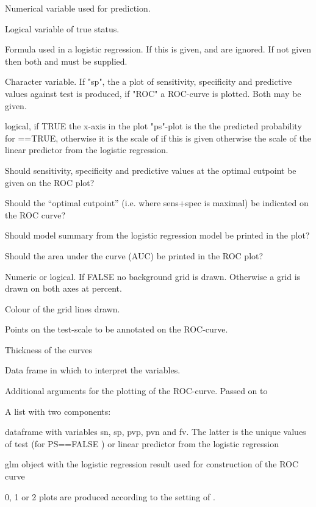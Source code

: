 \begin{Arguments}
\begin{ldescription}
\item[\code{test}] Numerical variable used for prediction. 
\item[\code{stat}] Logical variable of true status. 
\item[\code{form}] Formula used in a logistic regression. If this is given,
 and  are ignored. If not given then
both  and  must be supplied. 
\item[\code{plot}] Character variable. If "sp", the a plot of sensitivity,
specificity and predictive values against test is produced, if "ROC" a
ROC-curve is plotted. Both may be given.
\item[\code{PS}] logical, if TRUE the x-axis in the
plot "ps"-plot is the the predicted probability for
==TRUE, otherwise it is the scale of  if this
is given otherwise the scale of the linear predictor from the
logistic regression.
\item[\code{PV}] Should sensitivity, specificity and
predictive values at the optimal cutpoint be given on the ROC plot? 
\item[\code{MX}] Should the ``optimal cutpoint'' (i.e. where sens+spec is
maximal) be indicated on the ROC curve?
\item[\code{MI}] Should model summary from the logistic
regression model be printed in the plot?
\item[\code{AUC}] Should the area under the curve (AUC) be printed in the ROC
plot?
\item[\code{grid}] Numeric or logical. If FALSE no background grid is
drawn. Otherwise a grid is drawn on both axes at  percent.
\item[\code{col.grid}] Colour of the grid lines drawn.
\item[\code{cuts}] Points on the test-scale to be annotated on the
ROC-curve. 
\item[\code{lwd}] Thickness of the curves
\item[\code{data}] Data frame in which to interpret the variables.
\item[\code{...}] Additional arguments for the plotting of the
ROC-curve. Passed on to 
\end{ldescription}
\end{Arguments}
\begin{Value}
A list with two components:
\begin{ldescription}
\item[\code{res}] dataframe with variables sn, sp, pvp, pvn and fv. The
latter is the unique values of test (for PS==FALSE ) or linear predictor from the
logistic regression
\item[\code{lr}] glm object with the logistic regression result used for
construction of the ROC curve
\end{ldescription}

0, 1 or 2 plots are produced according to the setting of .
\end{Value}
